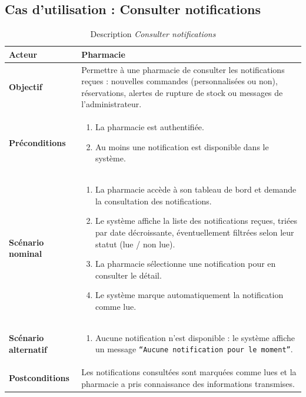 \documentclass[12pt,a4paper]{report}
\begin{document}
\subsection*{Cas d'utilisation : Consulter notifications}

\begin{table}[H]
    \centering
    \begin{tabular}{|p{4cm}|p{9cm}|}
        \hline
        \textbf{Acteur} & Pharmacie \\
        \hline
        \textbf{Objectif} & Permettre à une pharmacie de consulter les notifications reçues : nouvelles commandes (personnalisées ou non), réservations, alertes de rupture de stock ou messages de l'administrateur. \\
        \hline
        \textbf{Préconditions} &
        \begin{enumerate}
            \item La pharmacie est authentifiée.
            \item Au moins une notification est disponible dans le système.
        \end{enumerate} \\
        \hline
        \textbf{Scénario nominal} &
        \begin{enumerate}
            \item La pharmacie accède à son tableau de bord et demande la consultation des notifications.
            \item Le système affiche la liste des notifications reçues, triées par date décroissante, éventuellement filtrées selon leur statut (lue / non lue).
            \item La pharmacie sélectionne une notification pour en consulter le détail.
            \item Le système marque automatiquement la notification comme lue.
        \end{enumerate} \\
        \hline
        \textbf{Scénario alternatif} &
        \begin{enumerate}
            \item[2.a] Aucune notification n'est disponible : le système affiche un message \texttt{``Aucune notification pour le moment''}.
        \end{enumerate} \\
        \hline
        \textbf{Postconditions} & Les notifications consultées sont marquées comme lues et la pharmacie a pris connaissance des informations transmises. \\
        \hline
    \end{tabular}
    \caption{Description \textit{Consulter notifications}}
\end{table}
\end{document}
